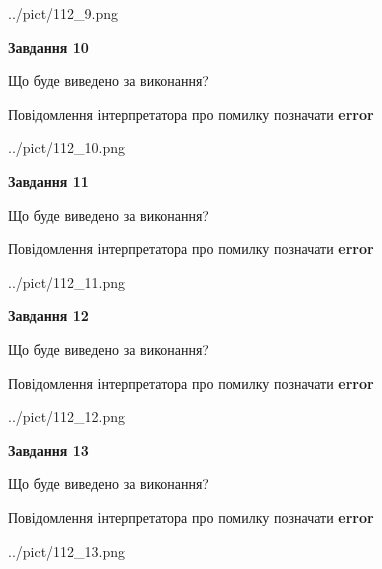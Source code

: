 \documentclass[11pt, ukrainian]{article}
\begin{document}
{\begin {large}
\begin{center}
	{../pict/112_9.png}
\end{center}
\newpage

{\begin {center}\textbf{Завдання 10}\end {center}}\par
Що буде виведено за виконання? \par
Повідомлення інтерпретатора про помилку позначати \textbf{error}

\begin{center}
	{../pict/112_10.png}
\end{center}
\newpage

{\begin {center}\textbf{Завдання 11}\end {center}}\par
Що буде виведено за виконання? \par
Повідомлення інтерпретатора про помилку позначати \textbf{error}

\begin{center}
	{../pict/112_11.png}
\end{center}
\newpage

{\begin {center}\textbf{Завдання 12}\end {center}}\par
Що буде виведено за виконання? \par
Повідомлення інтерпретатора про помилку позначати \textbf{error}

\begin{center}
	{../pict/112_12.png}
\end{center}
\newpage

{\begin {center}\textbf{Завдання 13}\end {center}}\par
Що буде виведено за виконання? \par
Повідомлення інтерпретатора про помилку позначати \textbf{error}

\begin{center}
	{../pict/112_13.png}
\end{center}
\newpage


\end{large}}
\end{document}
